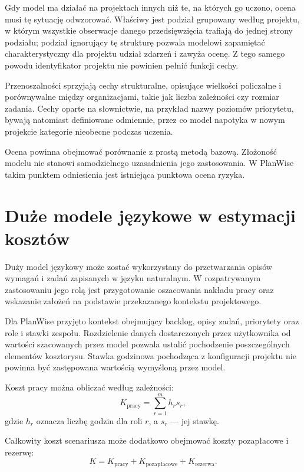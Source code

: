 Gdy model ma działać na projektach innych niż te, na których go uczono, ocena musi tę sytuację odwzorować. Właściwy jest podział grupowany według projektu, w którym wszystkie obserwacje danego przedsięwzięcia trafiają do jednej strony podziału; podział ignorujący tę strukturę pozwala modelowi zapamiętać charakterystyczny dla projektu udział zdarzeń i zawyża ocenę. Z tego samego powodu identyfikator projektu nie powinien pełnić funkcji cechy.

Przenoszalności sprzyjają cechy strukturalne, opisujące wielkości policzalne i porównywalne między organizacjami, takie jak liczba zależności czy rozmiar zadania. Cechy oparte na słownictwie, na przykład nazwy poziomów priorytetu, bywają natomiast definiowane odmiennie, przez co model napotyka w nowym projekcie kategorie nieobecne podczas uczenia.

Ocena powinna obejmować porównanie z prostą metodą bazową. Złożoność modelu nie stanowi samodzielnego uzasadnienia jego zastosowania. W PlanWise takim punktem odniesienia jest istniejąca punktowa ocena ryzyka.


\section{Duże modele językowe w estymacji kosztów}
\label{sec:llm-estymacja-kosztow}

Duży model językowy może zostać wykorzystany do przetwarzania opisów wymagań i zadań zapisanych w języku naturalnym. W rozpatrywanym zastosowaniu jego rolą jest przygotowanie oszacowania nakładu pracy oraz wskazanie założeń na podstawie przekazanego kontekstu projektowego.

Dla PlanWise przyjęto kontekst obejmujący backlog, opisy zadań, priorytety oraz role i stawki zespołu. Rozdzielenie danych dostarczonych przez użytkownika od wartości szacowanych przez model pozwala ustalić pochodzenie poszczególnych elementów kosztorysu. Stawka godzinowa pochodząca z konfiguracji projektu nie powinna być zastępowana wartością wymyśloną przez model.

Koszt pracy można obliczać według zależności:
\begin{equation}
    K_{\mathrm{pracy}} = \sum_{r=1}^{m} h_r s_r,
    \label{eq:koszt-pracy}
\end{equation}
gdzie \(h_r\) oznacza liczbę godzin dla roli \(r\), a \(s_r\) --- jej stawkę.

Całkowity koszt scenariusza może dodatkowo obejmować koszty pozapłacowe i rezerwę:
\begin{equation}
    K =
    K_{\mathrm{pracy}} +
    K_{\text{pozapłacowe}} +
    K_{\mathrm{rezerwa}}.
    \label{eq:koszt-calkowity}
\end{equation}

